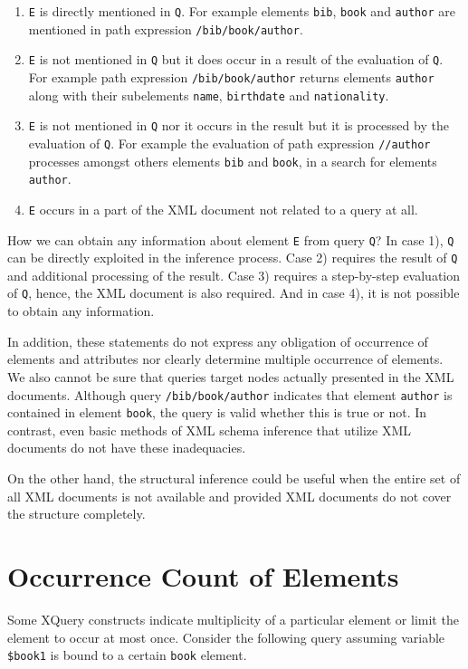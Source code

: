\begin{enumerate}[1)]
\item \texttt{E} is directly mentioned in \texttt{Q}. For example elements \texttt{bib}, \texttt{book} and \texttt{author} are mentioned in path expression \texttt{/bib/book/author}.
\item \texttt{E} is not mentioned in \texttt{Q} but it does occur in a result of the evaluation of \texttt{Q}. For example path expression \texttt{/bib/book/author} returns elements \texttt{author} along with their subelements \texttt{name}, \texttt{birthdate} and \texttt{nationality}.
\item \texttt{E} is not mentioned in \texttt{Q} nor it occurs in the result but it is processed by the evaluation of \texttt{Q}. For example the evaluation of path expression \texttt{//author} processes amongst others elements \texttt{bib} and \texttt{book}, in a search for elements \texttt{author}.
\item \texttt{E} occurs in a part of the XML document not related to a query at all.
\end{enumerate}

How we can obtain any information about element \texttt{E} from query \texttt{Q}? In case 1), \texttt{Q} can be directly exploited in the inference process. Case 2) requires the result of \texttt{Q} and additional processing of the result. Case 3) requires a step-by-step evaluation of \texttt{Q}, hence, the XML document is also required. And in case 4), it is not possible to obtain any information. 

In addition, these statements do not express any obligation of occurrence of elements and attributes nor clearly determine multiple occurrence of elements. We also cannot be sure that queries target nodes actually presented in the XML documents. Although query \texttt{/bib/book/author} indicates that element \texttt{author} is contained in element \texttt{book}, the query is valid whether this is true or not. In contrast, even basic methods of XML schema inference that utilize XML documents do not have these inadequacies.

On the other hand, the structural inference could be useful when the entire set of all XML documents is not available and provided XML documents do not cover the structure completely.

\section{Occurrence Count of Elements}
Some XQuery constructs indicate multiplicity of a particular element or limit the element to occur at most once. Consider the following query assuming variable \texttt{\$book1} is bound to a certain \texttt{book} element.

